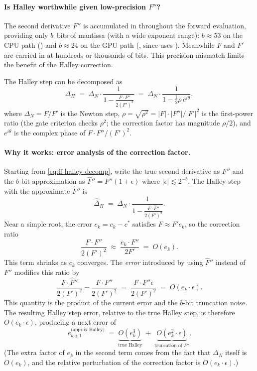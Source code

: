 \paragraph{Is Halley worthwhile given low-precision $F''$?}
The second derivative $F''$ is accumulated in 
throughout the forward evaluation, providing only $b$~bits of
mantissa (with a wide exponent range): $b \approx 53$ on the CPU path
() and $b \approx 24$ on the GPU path
(, since  uses
).  Meanwhile $F$ and $F'$ are carried in
 at hundreds or thousands of bits.  This precision mismatch
limits the benefit of the Halley correction.

The Halley step can be decomposed as
\begin{equation}\label{eq:ff-halley-decomp}
\Delta_H \;=\; \Delta_N \cdot \frac{1}{1 - \frac{F \cdot F''}{2(F')^2}}
\;=\; \Delta_N \cdot \frac{1}{1 - \tfrac{1}{2}\rho\, e^{i\theta}},
\end{equation}
where $\Delta_N = F/F'$ is the Newton step, $\rho = \sqrt{\rho^2} =
|F|\cdot|F''|/|F'|^2$ is the first-power ratio (the gate criterion checks
$\rho^2$; the correction factor has magnitude $\rho/2$), and $e^{i\theta}$
is the complex phase of $F \cdot F'' / (F')^2$.

\paragraph{Why it works: error analysis of the correction factor.}
Starting from \eqref{eq:ff-halley-decomp}, write the true second derivative as $F''$ and the $b$-bit approximation as
$\hat{F}'' = F''(1 + \epsilon)$ where $|\epsilon| \lesssim 2^{-b}$.  The
Halley step with the approximate $\hat{F}''$ is
\[
\hat{\Delta}_H \;=\; \Delta_N \cdot
  \frac{1}{1 - \frac{F \cdot \hat{F}''}{2(F')^2}}.
\]
Near a simple root, the error $e_k = c_k - c^*$ satisfies $F \approx F' e_k$,
so the correction ratio
\[
\frac{F \cdot F''}{2(F')^2} \;\approx\;
  \frac{e_k \cdot F''}{2 F'} \;=\; O(e_k).
\]
This term shrinks as $c_k$ converges.  The \emph{error} introduced by using
$\hat{F}''$ instead of $F''$ modifies this ratio by
\[
\frac{F \cdot \hat{F}''}{2(F')^2}
  - \frac{F \cdot F''}{2(F')^2}
  \;=\; \frac{F \cdot F'' \epsilon}{2(F')^2}
  \;=\; O(e_k \cdot \epsilon).
\]
This quantity is the product of the current error and the $b$-bit truncation noise.
The resulting Halley step error, relative to the true Halley step, is therefore
$O(e_k \cdot \epsilon)$, producing a next error of
\[
e_{k+1}^{\text{(approx Halley)}} \;=\;
  \underbrace{O(e_k^3)}_{\text{true Halley}}
  \;+\;
  \underbrace{O(e_k^2 \cdot \epsilon)}_{\text{truncation of } F''}.
\]
(The extra factor of $e_k$ in the second term comes from the fact that
$\Delta_N$ itself is $O(e_k)$, and the relative perturbation of the
correction factor is $O(e_k \cdot \epsilon)$.)

